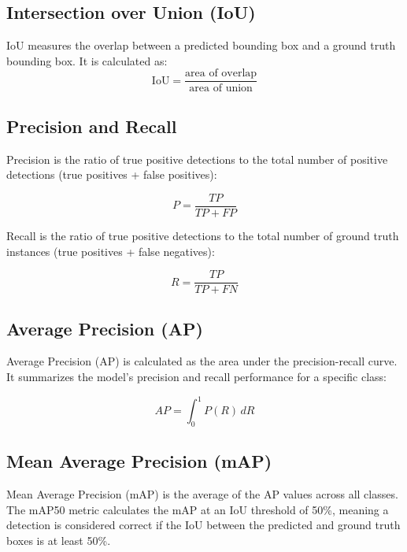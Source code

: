 \subsection{Intersection over Union (IoU)}
IoU measures the overlap between a predicted bounding box and a ground truth bounding box. It is calculated as:
\begin{equation}
\text{IoU} = \frac{\text{area of overlap}}{\text{area of union}}
\end{equation}\cite{padilla2021comparative}

\subsection{Precision and Recall}
Precision is the ratio of true positive detections to the total number of positive detections (true positives + false positives):

\begin{equation} P = \frac{TP}{TP + FP} \end{equation}\cite{padilla2021comparative}

Recall is the ratio of true positive detections to the total number of ground truth instances (true positives + false negatives):

\begin{equation} R = \frac{TP}{TP + FN} \end{equation}\cite{padilla2021comparative}

\subsection{Average Precision (AP)}
Average Precision (AP) is calculated as the area under the precision-recall curve. It summarizes the model's precision and recall performance for a specific class:

\begin{equation} AP = \int_{0}^{1} P(R) \, dR \end{equation}\cite{padilla2021comparative}

\subsection{Mean Average Precision (mAP)}
Mean Average Precision (mAP) is the average of the AP values across all classes. The mAP50 metric calculates the mAP at an IoU threshold of 50\%, meaning a detection is considered correct if the IoU between the predicted and ground truth boxes is at least 50\%.

